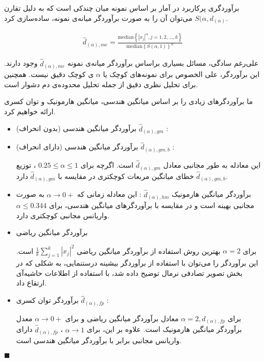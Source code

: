 برآوردگری پرکاربرد در آمار بر اساس نمونه میان چندکی %
\cite{litez67, litez68, litez138}
است  که به دلیل تقارن 
$S(\alpha, d_{(\alpha)}$
می‌توان آن را به صورت برآوردگر میانه‌ی نمونه، ساده‌سازی کرد.

\begin{align}
\hat{d}_{(\alpha),me} = \frac
{ \mathrm{median} \left \{ \left| x_j \right|^{\alpha} , j = 1,2, \ldots, k \right \} }
{ \mathrm{median} \left \{ S(\alpha, 1) \right \}^{\alpha} }
\label{eq:1iW}
\end{align}

علی‌رغم سادگی، مسائل بسیاری براساس برآوردگر میانه‌ی نمونه
$\hat{d}_{(\alpha), me}$
وجود دارند. این برآوردگر، علی الخصوص برای نمونه‌های کوچک یا 
$\alpha$
ی کوچک دقیق نیست. همچنین برای تحلیل نظری دقیق از جمله تحلیل محدوده‌ی دم دشوار است.

ما برآوردگرهای زیادی را بر اساس میانگین هندسی، میانگین هارمونیک و توان کسری ارائه خواهیم کرد.

\begin{itemize}
\item
برآوردگر میانگین هندسی (بدون انحراف) 
$\hat{d}_{(\alpha),gm}$
:
\item
برآوردگر میانگین هندسی (دارای انحراف) 
$\hat{d}_{(\alpha),gm,b}$
:

این معادله به طور مجانبی معادل
$\hat{d}_{(\alpha),gm}$
است. اگرچه برای 
$0.25 \leq \alpha \leq 1$
، توزیع
$\hat{d}_{(\alpha),gm,b}$
خطای میانگین مربعات کوچکتری در مقایسه با
$\hat{d}_{(\alpha),gm}$
دارد.
\item
برآوردگر میانگین هارمونیک 
$\hat{d}_{(\alpha),hm}$
:
این معادله زمانی که 
$\alpha \rightarrow 0+$
به صورت مجانبی بهینه است و در مقایسه با برآوردگرهای میانگین هندسی، برای 
$\alpha \leq 0.344$
واریانس مجانبی کوچکتری دارد.

\item
برآوردگر میانگین ریاضی

برای 
$\alpha = 2$
بهترین روش استفاده از برآوردگر میانگین ریاضی 
$\frac{1}{k} \sum_{j=1}^k \left| x_j \right|^2$
است. این برآوردگر را می‌توان با استفاده از برآوردگر بیشینه درستنمایی، به شکلی که در بخش تصویر تصادفی نرمال توضیح داده شد، با استفاده از اطلاعات حاشیه‌آی ارتقاع داد.
\item
برآوردگر توان کسری
$\hat{d}_{(\alpha),fp}$
:

برای 
$\alpha = 2, \hat{d}_{(\alpha), fp}$
معادل برآوردگر میانگین ریاضی و برای 
$\alpha \rightarrow 0+$
معدل برآوردگر میانگین هارمونیک است. علاوه بر این، برای 
$\alpha \rightarrow 1$
،
$\hat{d}_{(\alpha),fp}$
دارای واریانس مجانبی برابر با برآوردگر میانگین هندسی است.
\end{itemize}

$\blacksquare$
\bigskip























